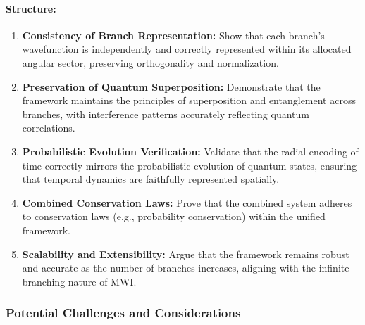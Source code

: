\documentclass[12pt]{article}
\begin{document}
\paragraph{Structure:}
\begin{enumerate}
    \item \textbf{Consistency of Branch Representation:}
    Show that each branch’s wavefunction is independently and correctly represented within its allocated angular sector, preserving orthogonality and normalization.
    
    \item \textbf{Preservation of Quantum Superposition:}
    Demonstrate that the framework maintains the principles of superposition and entanglement across branches, with interference patterns accurately reflecting quantum correlations.
    
    \item \textbf{Probabilistic Evolution Verification:}
    Validate that the radial encoding of time correctly mirrors the probabilistic evolution of quantum states, ensuring that temporal dynamics are faithfully represented spatially.
    
    \item \textbf{Combined Conservation Laws:}
    Prove that the combined system adheres to conservation laws (e.g., probability conservation) within the unified framework.
    
    \item \textbf{Scalability and Extensibility:}
    Argue that the framework remains robust and accurate as the number of branches increases, aligning with the infinite branching nature of MWI.
\end{enumerate}

\subsubsection{Potential Challenges and Considerations}
\end{document}
